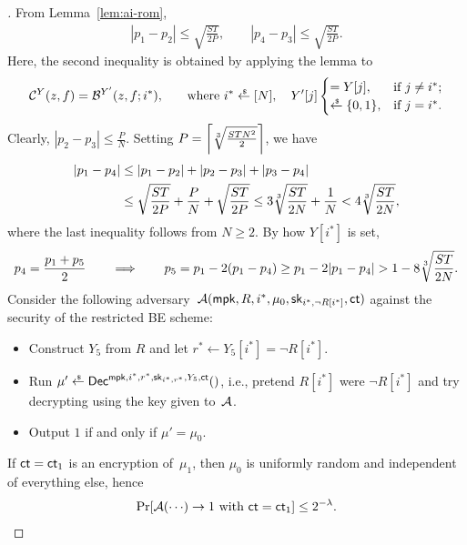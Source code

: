 \begin{proof}[]
From Lemma~\ref{lem:ai-rom},
\begin{align*}
|p_1-p_2|\leq\sqrt{\frac{ST}{2P}},\qquad
|p_4-p_3|\leq\sqrt{\frac{ST}{2P}}.
\end{align*}
Here, the second inequality is obtained by applying the lemma to
\begin{align*}
\scriptC^Y(z,f)=\scriptB^{Y'}(z,f;i^\ast)\textup{,\qquad where }
i^\ast\draws[N],\quad
Y'[j]\begin{cases}
=Y[j],&\textup{if }j\neq i^\ast;\\
\draws\bit,&\textup{if }j=i^\ast.
\end{cases}
\end{align*}
Clearly, ${|p_2-p_3|\leq\frac{P}{N}}$.
Setting ${P=\left\lceil\sqrt[3]{\frac{STN^2}{2}}\right\rceil}$, we have
\begin{align*}
|p_1-p_4|
&{}\leq
|p_1-p_2|+|p_2-p_3|+|p_3-p_4|
\\&{}\leq
\sqrt{\frac{ST}{2P}}+\frac{P}{N}+\sqrt{\frac{ST}{2P}}
\leq
3\sqrt[3]{\frac{ST}{2N}}+\frac1N
<
4\sqrt[3]{\frac{ST}{2N}},
\end{align*}
where the last inequality follows from ${N\geq 2}$.
By how $Y[i^\ast]$ is set,
\begin{align*}
p_4=\frac{p_1+p_5}{2}
\WideNarrow{}{\!\!}
\qquad\Longrightarrow\qquad
\WideNarrow{}{\!\!}
p_5
=p_1-2(p_1-p_4)
\geq p_1-2|p_1-p_4|
>1-8\cbrt{\frac{ST}{2N}}.
\end{align*}
Consider the following adversary~$\scriptA(\mpk,R,i^\ast,\mu_0,\sk_{i^\ast,\neg R[i^\ast]},\ct)$ against the security of the restricted BE scheme:
\begin{itemize}
\item Construct $Y_5$ from $R$ and
let ${r^\ast\gets Y_5[i^\ast]=\neg R[i^\ast]}$.
\item Run ${\mu'\draws\Dec^{\mpk,i^\ast,r^\ast,\sk_{i^\ast,r^\ast},Y_5,\ct}()}$,
i.e., pretend $R[i^\ast]$ were $\neg R[i^\ast]$ and try decrypting using the key given to~${\mathcal{A}}$.
\item Output $1$ if and only if ${\mu'=\mu_0}$.
\end{itemize}
If ${\ct=\ct_1}$ is an encryption of~$\mu_1$, then $\mu_0$ is uniformly random and independent of everything else, hence
\begin{align*}
\Pr[\scriptA({\cdots})\to 1\textup{ with }\ct=\ct_1]\leq 2^{-\lambda}.
\end{align*}

\end{proof}

